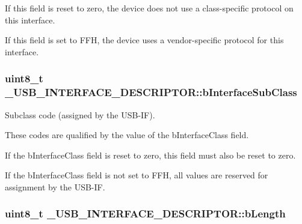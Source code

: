 If this field is reset to zero, the device does not use a class-\/specific protocol on this interface. \par
If this field is set to F\-F\-H, the device uses a vendor-\/specific protocol for this interface. \hypertarget{struct__USB__INTERFACE__DESCRIPTOR_af88328ec7f751751f3397df1c4c032b2}{
\subsubsection[{b\-Interface\-Sub\-Class}]{\setlength{\rightskip}{0pt plus 5cm}uint8\-\_\-t \-\_\-\-U\-S\-B\-\_\-\-I\-N\-T\-E\-R\-F\-A\-C\-E\-\_\-\-D\-E\-S\-C\-R\-I\-P\-T\-O\-R\-::b\-Interface\-Sub\-Class}}\label{struct__USB__INTERFACE__DESCRIPTOR_af88328ec7f751751f3397df1c4c032b2}
Subclass code (assigned by the U\-S\-B-\/\-I\-F). \par
These codes are qualified by the value of the b\-Interface\-Class field. \par
If the b\-Interface\-Class field is reset to zero, this field must also be reset to zero. \par
If the b\-Interface\-Class field is not set to F\-F\-H, all values are reserved for assignment by the U\-S\-B-\/\-I\-F. \hypertarget{struct__USB__INTERFACE__DESCRIPTOR_a16fbd548f47d86ea2c045da5a091ed79}{
\subsubsection[{b\-Length}]{\setlength{\rightskip}{0pt plus 5cm}uint8\-\_\-t \-\_\-\-U\-S\-B\-\_\-\-I\-N\-T\-E\-R\-F\-A\-C\-E\-\_\-\-D\-E\-S\-C\-R\-I\-P\-T\-O\-R\-::b\-Length}}\label{struct__USB__INTERFACE__DESCRIPTOR_a16fbd548f47d86ea2c045da5a091ed79}
